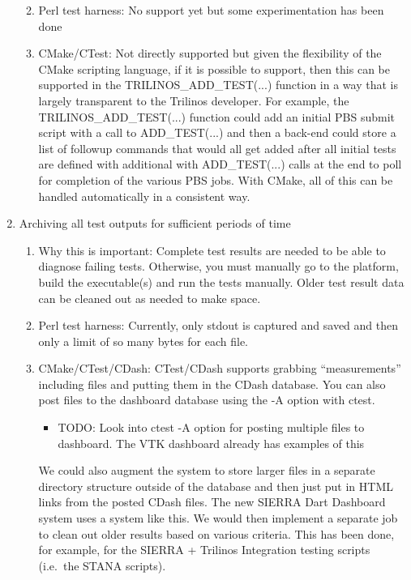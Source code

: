 \documentclass[pdf,ps2pdf,11pt]{SANDreport}
\begin{document}
\begin{enumerate}
\begin{enumerate}
  {}\item Perl test harness: No support yet but some experimentation
  has been done

  {}\item CMake/CTest: Not directly supported but given the
  flexibility of the CMake scripting language, if it is possible to
  support, then this can be supported in the TRILINOS\_ADD\_TEST(...) 
  function in a way that is largely transparent to the Trilinos
  developer.  For example, the TRILINOS\_ADD\_TEST(...) function could
  add an initial PBS submit script with a call to ADD\_TEST(...) and
  then a back-end could store a list of followup commands that would
  all get added after all initial tests are defined with additional
  with ADD\_TEST(...) calls at the end to poll for completion of the
  various PBS jobs.  With CMake, all of this can be handled
  automatically in a consistent way.

  \end{enumerate}

{}\item Archiving all test outputs for sufficient periods of time

  \begin{enumerate}

  {}\item Why this is important: Complete test results are needed to
  be able to diagnose failing tests.  Otherwise, you must manually go
  to the platform, build the executable(s) and run the tests manually.
  Older test result data can be cleaned out as needed to make space.

  {}\item Perl test harness: Currently, only stdout is captured and
  saved and then only a limit of so many bytes for each file.

  {}\item CMake/CTest/CDash: CTest/CDash supports grabbing
  ``measurements'' including files and putting them in the CDash
  database.  You can also post files to the dashboard database using
  the -A option with ctest.

    \begin{itemize}

    {}\item TODO: Look into ctest -A option for posting multiple files
    to dashboard.  The VTK dashboard already has examples of this

    \end{itemize}

  We could also augment the system to store larger files in a separate
  directory structure outside of the database and then just put in
  HTML links from the posted CDash files.  The new SIERRA Dart
  Dashboard system uses a system like this.  We would then implement a
  separate job to clean out older results based on various criteria.
  This has been done, for example, for the SIERRA + Trilinos
  Integration testing scripts (i.e.\ the STANA scripts).


\end{enumerate}
\end{enumerate}
\end{document}
